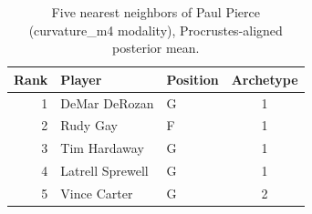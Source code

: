 \begin{table}[htbp]
  \centering\small
  \begin{tabular}{rllc}
    \toprule
    Rank & Player & Position & Archetype \\
    \midrule
    1 & DeMar DeRozan & G & 1 \\
    2 & Rudy Gay & F & 1 \\
    3 & Tim Hardaway & G & 1 \\
    4 & Latrell Sprewell & G & 1 \\
    5 & Vince Carter & G & 2 \\
    \bottomrule
  \end{tabular}
  \caption{Five nearest neighbors of Paul Pierce (curvature_m4 modality), Procrustes-aligned posterior mean.}
  \label{tab:Paul_Pierce_neighbors_curvature_m4}
\end{table}

